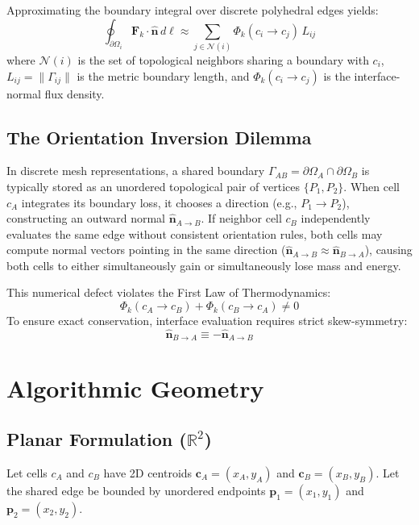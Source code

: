 \documentclass[10pt,twocolumn,a4paper]{article}
\begin{document}
Approximating the boundary integral over discrete polyhedral edges yields:
\begin{equation}
\oint_{\partial \Omega_i} \mathbf{F}_k \cdot \hat{\mathbf{n}} \, d\ell \approx \sum_{j \in \mathcal{N}(i)} \Phi_k(c_i \to c_j) \, L_{ij}
\end{equation}
where $\mathcal{N}(i)$ is the set of topological neighbors sharing a boundary with $c_i$, $L_{ij} = \|\Gamma_{ij}\|$ is the metric boundary length, and $\Phi_k(c_i \to c_j)$ is the interface-normal flux density.

\subsection{The Orientation Inversion Dilemma}
In discrete mesh representations, a shared boundary $\Gamma_{AB} = \partial \Omega_A \cap \partial \Omega_B$ is typically stored as an unordered topological pair of vertices $\{P_1, P_2\}$. When cell $c_A$ integrates its boundary loss, it chooses a direction (e.g., $P_1 \to P_2$), constructing an outward normal $\hat{\mathbf{n}}_{A \to B}$. If neighbor cell $c_B$ independently evaluates the same edge without consistent orientation rules, both cells may compute normal vectors pointing in the same direction ($\hat{\mathbf{n}}_{A \to B} \approx \hat{\mathbf{n}}_{B \to A}$), causing both cells to either simultaneously gain or simultaneously lose mass and energy. 

This numerical defect violates the First Law of Thermodynamics:
\begin{equation}
\Phi_k(c_A \to c_B) + \Phi_k(c_B \to c_A) \neq 0
\end{equation}
To ensure exact conservation, interface evaluation requires strict skew-symmetry:
\begin{equation}
\hat{\mathbf{n}}_{B \to A} \equiv -\hat{\mathbf{n}}_{A \to B}
\end{equation}

\section{Algorithmic Geometry}

\subsection{Planar Formulation ($\mathbb{R}^2$)}
Let cells $c_A$ and $c_B$ have 2D centroids $\mathbf{c}_A = (x_A, y_A)$ and $\mathbf{c}_B = (x_B, y_B)$. Let the shared edge be bounded by unordered endpoints $\mathbf{p}_1 = (x_1, y_1)$ and $\mathbf{p}_2 = (x_2, y_2)$.
\end{document}
